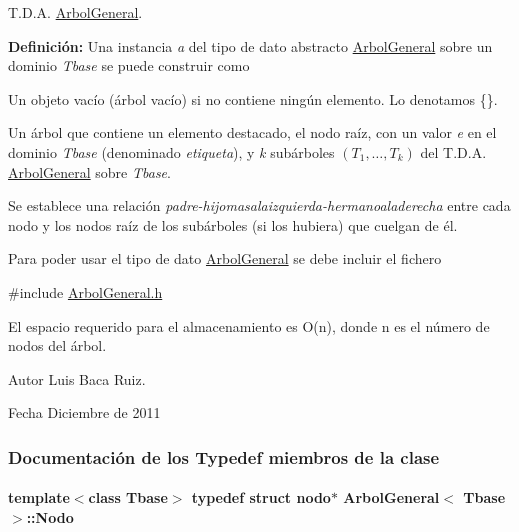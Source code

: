T.\+D.\+A. \hyperlink{classArbolGeneral}{Arbol\+General}. 

{\bfseries Definición\+:} Una instancia {\itshape a} del tipo de dato abstracto \hyperlink{classArbolGeneral}{Arbol\+General} sobre un dominio {\itshape Tbase} se puede construir como


\begin{DoxyItemize}
\item Un objeto vacío (árbol vacío) si no contiene ningún elemento. Lo denotamos \{\}.
\item Un árbol que contiene un elemento destacado, el nodo raíz, con un valor {\itshape e} en el dominio {\itshape Tbase} (denominado {\itshape etiqueta}), y {\itshape k} subárboles $(T_1, \ldots, T_k)$ del T.\+D.\+A. \hyperlink{classArbolGeneral}{Arbol\+General} sobre {\itshape Tbase}.
\end{DoxyItemize}

Se establece una relación {\itshape padre-\/hijomasalaizquierda-\/hermanoaladerecha} entre cada nodo y los nodos raíz de los subárboles (si los hubiera) que cuelgan de él.

Para poder usar el tipo de dato \hyperlink{classArbolGeneral}{Arbol\+General} se debe incluir el fichero

{\ttfamily \#include \hyperlink{ArbolGeneral_8h}{Arbol\+General.\+h}}

El espacio requerido para el almacenamiento es O(n), donde n es el número de nodos del árbol.

\begin{DoxyAuthor}{Autor}
Luis Baca Ruiz. 
\end{DoxyAuthor}
\begin{DoxyDate}{Fecha}
Diciembre de 2011 
\end{DoxyDate}


\subsubsection{Documentación de los \textquotesingle{}Typedef\textquotesingle{} miembros de la clase}
\paragraph[{\texorpdfstring{Nodo}{Nodo}}]{\setlength{\rightskip}{0pt plus 5cm}template$<$class Tbase$>$ typedef struct {\bf nodo}$\ast$ {\bf Arbol\+General}$<$ Tbase $>$\+::{\bf Nodo}}\hypertarget{classArbolGeneral_a12cc1b74a9095d89bc7334290d332f7a}{}\label{classArbolGeneral_a12cc1b74a9095d89bc7334290d332f7a}


